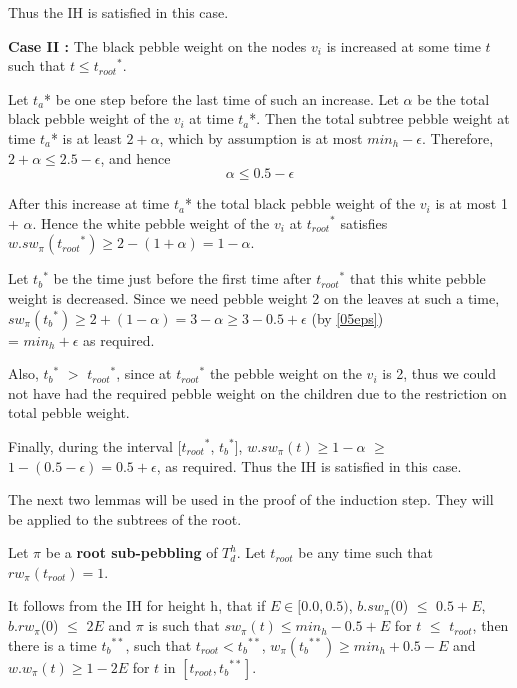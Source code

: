 \documentclass[oribib1]{llncs}
\newcommand{\troot}{t_{root}}
\newcommand{\troots}{{t_{root}}^*}
\newcommand{\tbss}{{t_b}^{**}}
\newcommand{\tbs}{{t_b}^{*}}
\begin{document}
Thus the IH is satisfied in this case.

\medskip

\noindent
{\bf Case II :}  The black pebble weight on the nodes $v_i$ is increased at some time $t$ such that $t \leq
\troots$.

Let $t_a$* be one step before the last time of such an increase.
Let $\alpha$ be the total black pebble weight of the $v_i$ at time $t_a$*.
Then the total subtree pebble weight at time $t_a$* is at least $2+\alpha$,
which by assumption is at most $min_h - \epsilon$.  Therefore, $2+ \alpha \le 2.5 - \epsilon$, and hence
\begin{equation}\alpha \le 0.5 - \epsilon \label{05eps}\end{equation}

After this increase at time $t_a$* the total black pebble weight of the $v_i$
is at most 1 + $\alpha$.  Hence the white pebble weight of the $v_i$ at
$\troots$ satisfies $w.sw_\pi(\troots) \ge 2-(1 + \alpha) = 1-\alpha$.

Let $\tbs$ be the time just before the first time after $\troots$ that this
white pebble weight is decreased.  Since we need pebble weight 2 on the
leaves at such a time,
$sw_\pi(\tbs) \ge 2+(1-\alpha) = 3-\alpha
 \ge 3 - 0.5 + \epsilon$ (by \ref{05eps})\\
= $min_h + \epsilon$ as required. 

Also, $\tbs$ $>$ $\troots$, since at $\troots$ the pebble weight on the $v_i$ is 2, thus we could not have had the required pebble weight on the children due to the restriction on total pebble weight.

Finally, during the interval [$\troots$, $\tbs$], $w.sw_\pi(t) \geq 1-\alpha$ $\ge$ $1 - (0.5 - \epsilon) = 0.5 +  \epsilon$, as required. Thus the IH is satisfied in this case.
{\hspace{\fill}{$\blacksquare$} \bigskip}



The next two lemmas will be used in the proof of the induction step.
They will be applied to the subtrees of the root.

\begin{lemma} \label{flb1}
Let $\pi$ be a {\bf root sub-pebbling}
of $T^h_d$. Let $\troot$ be any time such that $rw_\pi(\troot) = 1$.

It follows from the IH for height h, that if $E \in [0.0, 0.5)$, $b.sw_{\pi}$(0) $\leq$ $0.5+E$, $b.rw_{\pi}$(0) $\leq$ $2E$ and $\pi$ is such that $sw_\pi(t) \leq min_h-0.5+E$ for $t$ $\leq$ $\troot$, then there is a time $\tbss$, such that $\troot<\tbss$, $w_\pi(\tbss) \geq min_h+0.5-E$ and $w.w_\pi(t) \geq 1-2E$ for $t$ in $[\troot, \tbss]$.

\end{lemma}
\end{document}
